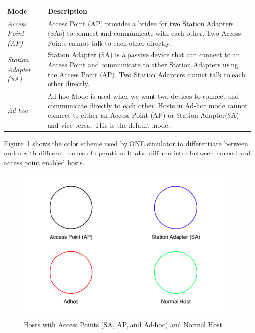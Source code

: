 	\begin{center}
	    \begin{tabular}{ | l | p{10.5cm} |}
    		\hline
    		\textbf{Mode} & \textbf{Description} \\ \hline
    		\textit{Access Point (AP)} & Access Point (AP) provides a bridge for two Station Adapters (SAs) to connect and communicate with each other. Two Access Points cannot talk to each other directly. \\ \hline
    		\textit{Station Adapter (SA)} & Station Adapter (SA) is a passive device that can connect to an Access Point and communicate to other Station Adapters using the Access Point (AP). Two Station Adapters cannot talk to each other directly. \\ \hline
    		\textit{Ad-hoc} & Ad-hoc Mode is used when we want two devices to connect and communicate directly to each other. Hosts in Ad-hoc mode cannot connect to either an Access Point (AP) or Station Adapter(SA) and vice versa. This is the default mode.\\ \hline
    	\end{tabular}
	\end{center}
	\vspace{5mm}
	Figure~\ref{fig:aps1} shows the color scheme used by ONE simulator to differentiate between nodes with different modes of operation. It also differentiates between normal and access point enabled hosts.\newline
	\begin{figure}[h]
		\centering
		\includegraphics[scale=0.45]{./figures/aps-1}
		\caption{Hosts with Access Points (SA, AP, and Ad-hoc) and Normal Host}
		\label{fig:aps1}
	\end{figure}
